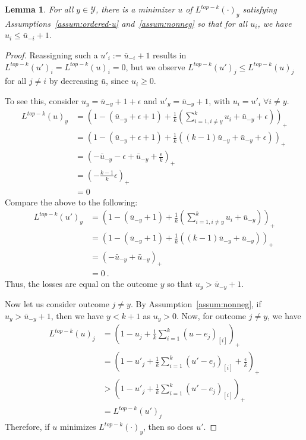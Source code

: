\documentclass[12pt]{article}
\newcommand{\ubar}{\bar{u}}
\newcommand{\Y}{\mathcal{Y}}
\newtheorem{lemma}{Lemma}
\begin{document}
\begin{lemma}\label{lem:top-threshold}
	For all $y \in \Y$, there is a minimizer $u$ of $L^{top-k}(\cdot)_y$ satisfying Assumptions~\ref{assum:ordered-u} and~\ref{assum:nonneg} so that for all $u_i$, we have $u_i \leq \bar u_{-i} +1$. 
\end{lemma}
\begin{proof}
	Reassigning such a $u'_i := \bar u_{-i} +1$ results in $L^{top-k}(u')_i = L^{top-k}(u)_i = 0$, but we observe $L^{top-k}(u')_j \leq L^{top-k}(u)_j$ for all $j \neq i$ by decreasing $\ubar$, since $u_i \geq 0$.

To see this, consider $u_y = \bar u_{-y} + 1 + \epsilon$ and $u'_y = \bar u_{-y} + 1$, with $u_i = u'_i \; \forall i \neq y$. 
\begin{align*}
L^{top-k}(u)_y &= \left(1 - (\bar u_{-y} + \epsilon + 1) + \frac 1 k \left(\sum_{i=1, i \neq y}^k u_i + \bar u_{-y} + \epsilon\right) \right)_+\\ 
&= \left(1 - (\bar u_{-y} + \epsilon + 1) + \frac 1 k \left((k-1) \bar u_{-y} + \bar u_{-y} + \epsilon\right) \right)_+\\
&= \left(-\bar u_{-y} - \epsilon + \bar u_{-y} + \frac \epsilon k \right)_+ \\
&= (-\frac{k-1}{k}\epsilon)_+\\
&= 0
\end{align*}
Compare the above to the following:
\begin{align*}
L^{top-k}(u')_y &= \left(1 - (\bar u_{-y} + 1) + \frac 1 k \left(\sum_{i=1, i \neq y}^k u_i + \bar u_{-y} \right) \right)_+\\ 
&= \left(1 - (\bar u_{-y} + 1) + \frac 1 k \left((k-1) \bar u_{-y} + \bar u_{-y} \right) \right)_+\\
&= \left(-\bar u_{-y} + \bar u_{-y}\right)_+ \\
&= 0~.~
\end{align*}
Thus, the losses are equal on the outcome $y$ so that $u_y > \bar u_{-y} + 1$.

Now let us consider outcome $j \neq y$.
By Assumption~\ref{assum:nonneg}, if $u_y > \bar u_{-y} + 1$, then we have $y < k+1$ as $u_y > 0$.
Now, for outcome $j \neq y$, we have 
\begin{align*}
L^{top-k}(u)_j &= \left( 1 - u_j + \frac 1 k \sum_{i=1}^k (u-e_j)_{[i]} \right)_+\\
	&= \left( 1 - u'_j + \frac 1 k \sum_{i=1}^k (u'-e_j)_{[i]} + \frac {\epsilon}{k}\right)_+\\
	&> \left( 1 - u'_j + \frac 1 k \sum_{i=1}^k (u'-e_j)_{[i]}\right)_+\\
	&= L^{top-k}(u')_j
\end{align*}
Therefore, if $u$ minimizes $L^{top-k}(\cdot)_y$, then so does $u'$.
\end{proof}
\end{document}
